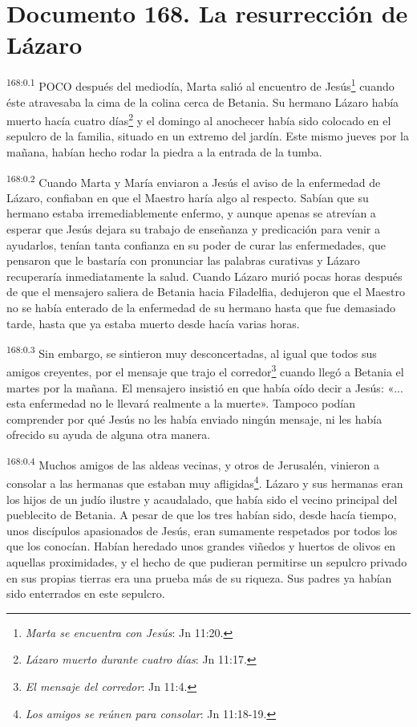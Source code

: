\chapter{Documento 168. La resurrección de Lázaro}
\par
\textsuperscript{168:0.1} POCO después del mediodía, Marta salió al encuentro de Jesús\footnote{\textit{Marta se encuentra con Jesús}: Jn 11:20.} cuando éste atravesaba la cima de la colina cerca de Betania. Su hermano Lázaro había muerto hacía cuatro días\footnote{\textit{Lázaro muerto durante cuatro días}: Jn 11:17.} y el domingo al anochecer había sido colocado en el sepulcro de la familia, situado en un extremo del jardín. Este mismo jueves por la mañana, habían hecho rodar la piedra a la entrada de la tumba.

\par
\textsuperscript{168:0.2} Cuando Marta y María enviaron a Jesús el aviso de la enfermedad de Lázaro, confiaban en que el Maestro haría algo al respecto. Sabían que su hermano estaba irremediablemente enfermo, y aunque apenas se atrevían a esperar que Jesús dejara su trabajo de enseñanza y predicación para venir a ayudarlos, tenían tanta confianza en su poder de curar las enfermedades, que pensaron que le bastaría con pronunciar las palabras curativas y Lázaro recuperaría inmediatamente la salud. Cuando Lázaro murió pocas horas después de que el mensajero saliera de Betania hacia Filadelfia, dedujeron que el Maestro no se había enterado de la enfermedad de su hermano hasta que fue demasiado tarde, hasta que ya estaba muerto desde hacía varias horas.

\par
\textsuperscript{168:0.3} Sin embargo, se sintieron muy desconcertadas, al igual que todos sus amigos creyentes, por el mensaje que trajo el corredor\footnote{\textit{El mensaje del corredor}: Jn 11:4.} cuando llegó a Betania el martes por la mañana. El mensajero insistió en que había oído decir a Jesús: «... esta enfermedad no le llevará realmente a la muerte». Tampoco podían comprender por qué Jesús no les había enviado ningún mensaje, ni les había ofrecido su ayuda de alguna otra manera.

\par
\textsuperscript{168:0.4} Muchos amigos de las aldeas vecinas, y otros de Jerusalén, vinieron a consolar a las hermanas que estaban muy afligidas\footnote{\textit{Los amigos se reúnen para consolar}: Jn 11:18-19.}. Lázaro y sus hermanas eran los hijos de un judío ilustre y acaudalado, que había sido el vecino principal del pueblecito de Betania. A pesar de que los tres habían sido, desde hacía tiempo, unos discípulos apasionados de Jesús, eran sumamente respetados por todos los que los conocían. Habían heredado unos grandes viñedos y huertos de olivos en aquellas proximidades, y el hecho de que pudieran permitirse un sepulcro privado en sus propias tierras era una prueba más de su riqueza. Sus padres ya habían sido enterrados en este sepulcro.

